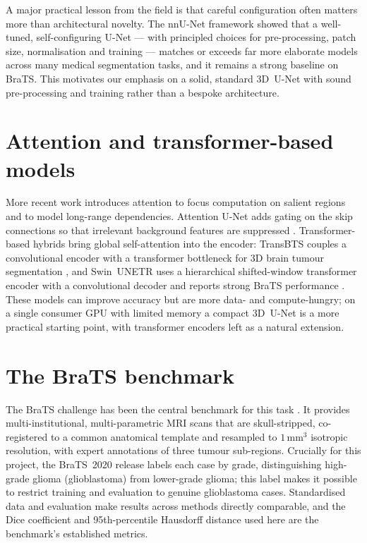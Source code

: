 A major practical lesson from the field is that careful configuration often
matters more than architectural novelty. The nnU-Net framework
\citep{isensee2021nnunet} showed that a well-tuned, self-configuring U-Net --- with
principled choices for pre-processing, patch size, normalisation and training ---
matches or exceeds far more elaborate models across many medical segmentation
tasks, and it remains a strong baseline on BraTS. This motivates our emphasis on
a solid, standard 3D~U-Net with sound pre-processing and training rather than a
bespoke architecture.

\section{Attention and transformer-based models}

More recent work introduces attention to focus computation on salient regions and
to model long-range dependencies. Attention U-Net adds gating on the skip
connections so that irrelevant background features are suppressed
\citep{oktay2018attentionunet}. Transformer-based hybrids bring global
self-attention into the encoder: TransBTS couples a convolutional encoder with a
transformer bottleneck for 3D brain tumour segmentation \citep{wang2021transbts},
and Swin~UNETR uses a hierarchical shifted-window transformer encoder with a
convolutional decoder and reports strong BraTS performance
\citep{hatamizadeh2022swinunetr}. These models can improve accuracy but are more
data- and compute-hungry; on a single consumer GPU with limited memory a compact
3D~U-Net is a more practical starting point, with transformer encoders left as a
natural extension.

\section{The BraTS benchmark}

The BraTS challenge has been the central benchmark for this task
\citep{menze2015brats,bakas2017advancing}. It provides multi-institutional,
multi-parametric MRI scans that are skull-stripped, co-registered to a common
anatomical template and resampled to $1\,\mathrm{mm}^3$ isotropic resolution, with
expert annotations of three tumour sub-regions. Crucially for this project, the
BraTS~2020 release labels each case by grade, distinguishing high-grade glioma
(glioblastoma) from lower-grade glioma; this label makes it possible to restrict
training and evaluation to genuine glioblastoma cases. Standardised data and
evaluation make results across methods directly comparable, and the Dice
coefficient and 95th-percentile Hausdorff distance used here are the benchmark's
established metrics.


